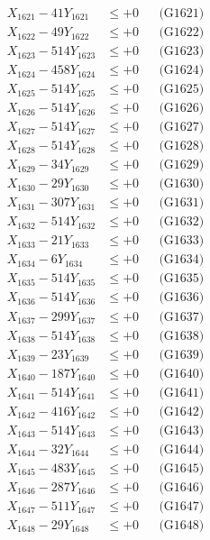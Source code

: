 \documentclass[a4paper,10pt]{article}
\begin{document}
{\begin{align}
\allowbreak
X_{1621} - 41Y_{1621} &\leq +0 && \text{(G1621)} \\
X_{1622} - 49Y_{1622} &\leq +0 && \text{(G1622)} \\
X_{1623} - 514Y_{1623} &\leq +0 && \text{(G1623)} \\
X_{1624} - 458Y_{1624} &\leq +0 && \text{(G1624)} \\
X_{1625} - 514Y_{1625} &\leq +0 && \text{(G1625)} \\
X_{1626} - 514Y_{1626} &\leq +0 && \text{(G1626)} \\
X_{1627} - 514Y_{1627} &\leq +0 && \text{(G1627)} \\
X_{1628} - 514Y_{1628} &\leq +0 && \text{(G1628)} \\
X_{1629} - 34Y_{1629} &\leq +0 && \text{(G1629)} \\
X_{1630} - 29Y_{1630} &\leq +0 && \text{(G1630)} \\
\allowbreak
X_{1631} - 307Y_{1631} &\leq +0 && \text{(G1631)} \\
X_{1632} - 514Y_{1632} &\leq +0 && \text{(G1632)} \\
X_{1633} - 21Y_{1633} &\leq +0 && \text{(G1633)} \\
X_{1634} - 6Y_{1634} &\leq +0 && \text{(G1634)} \\
X_{1635} - 514Y_{1635} &\leq +0 && \text{(G1635)} \\
X_{1636} - 514Y_{1636} &\leq +0 && \text{(G1636)} \\
X_{1637} - 299Y_{1637} &\leq +0 && \text{(G1637)} \\
X_{1638} - 514Y_{1638} &\leq +0 && \text{(G1638)} \\
X_{1639} - 23Y_{1639} &\leq +0 && \text{(G1639)} \\
X_{1640} - 187Y_{1640} &\leq +0 && \text{(G1640)} \\
\allowbreak
X_{1641} - 514Y_{1641} &\leq +0 && \text{(G1641)} \\
X_{1642} - 416Y_{1642} &\leq +0 && \text{(G1642)} \\
X_{1643} - 514Y_{1643} &\leq +0 && \text{(G1643)} \\
X_{1644} - 32Y_{1644} &\leq +0 && \text{(G1644)} \\
X_{1645} - 483Y_{1645} &\leq +0 && \text{(G1645)} \\
X_{1646} - 287Y_{1646} &\leq +0 && \text{(G1646)} \\
X_{1647} - 511Y_{1647} &\leq +0 && \text{(G1647)} \\
X_{1648} - 29Y_{1648} &\leq +0 && \text{(G1648)} \\

\end{align}}
\end{document}
